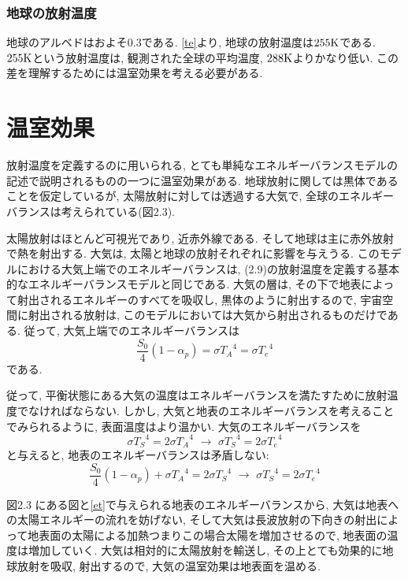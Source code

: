 \documentclass[a4j,12pt,openbib,oneside,dvipdfmx]{jbook}
\begin{document}
\subsubsection{地球の放射温度}
地球のアルベドはおよそ$0.3$である. \eqref{te}より, 地球の放射温度は$255 \rm{K}$である. $255 \rm{K}$という放射温度は, 観測された全球の平均温度, $288 \rm{K}$よりかなり低い. この差を理解するためには温室効果を考える必要がある.

\newpage
{}
\section{温室効果}
放射温度を定義するのに用いられる, とても単純なエネルギーバランスモデルの記述で説明されるものの一つに温室効果がある. 地球放射に関しては黒体であることを仮定しているが, 太陽放射に対しては透過する大気で, 全球のエネルギーバランスは考えられている(図2.3).
\par
太陽放射はほとんど可視光であり, 近赤外線である. そして地球は主に赤外放射で熱を射出する. 大気は, 太陽と地球の放射それぞれに影響を与えうる. 
このモデルにおける大気上端でのエネルギーバランスは, (2.9)の放射温度を定義する基本的なエネルギーバランスモデルと同じである. 大気の層は, その下で地表によって射出されるエネルギーのすべてを吸収し, 黒体のように射出するので, 宇宙空間に射出される放射は, このモデルにおいては大気から射出されるものだけである. 
従って, 大気上端でのエネルギーバランスは
\begin{equation}
 \frac{S_0}{4}(1-\alpha_p)=\sigma{T_A}^4=\sigma{T_e}^4 
\end{equation}
である.
\par
従って, 平衡状態にある大気の温度はエネルギーバランスを満たすために放射温度でなければならない. 
しかし, 大気と地表のエネルギーバランスを考えることでみられるように, 表面温度はより温かい. 大気のエネルギーバランスを
\begin{equation}
  \sigma{T_S}^4=2\sigma{T_A}^4\,\,\to\,\,\sigma{T_S}^4=2\sigma{T_e}^4
\end{equation}
と与えると, 地表のエネルギーバランスは矛盾しない:
\begin{equation}
  \frac{S_0}{4}(1-\alpha_p)+\sigma{T_A}^4=2\sigma{T_S}^4\,\,\to\,\,\sigma{T_S}^4=2\sigma{T_e}^4 \label{et}
\end{equation}
\par
図2.3 にある図と\eqref{et}で与えられる地表のエネルギーバランスから, 大気は地表への太陽エネルギーの流れを妨げない, そして大気は長波放射の下向きの射出によって地表面の太陽による加熱つまりこの場合太陽を増加させるので, 地表面の温度は増加していく. 大気は相対的に太陽放射を輸送し, その上とても効果的に地球放射を吸収, 射出するので, 大気の温室効果は地表面を温める.
\end{document}
